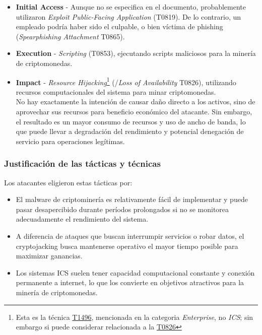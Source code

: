 \begin{itemize}
    \item \textbf{Initial Access} - Aunque no se especifica en el documento, probablemente utilizaron \textit{Exploit Public-Facing Application} (T0819). De lo contrario, un empleado podría haber sido el culpable, o bien víctima de phishing (\textit{Spearphishing Attachment} T0865).

        \item \textbf{Execution} - \textit{Scripting} (T0853), ejecutando scripts maliciosos para la minería de criptomonedas.
        
        \item \textbf{Impact} - \textit{Resource Hijacking}\footnote{Esta es la técnica \href{https://attack.mitre.org/techniques/T1496/}{T1496}, mencionada en la categoria \textit{Enterprise}, no \textit{ICS}; sin embargo si puede considerar relacionada a la \href{https://attack.mitre.org/techniques/T0826/}{T0826}} (/\textit{Loss of Availability} T0826), utilizando recursos computacionales del sistema para minar criptomonedas.\\
        No hay exactamente la intención de causar daño directo a los activos, sino de aprovechar sus recursos para beneficio económico del atacante.
        Sin embargo, el resultado es un mayor consumo de recursos y uso de ancho de banda, lo que puede llevar a degradación del rendimiento y potencial denegación de servicio para operaciones legítimas.
\end{itemize}

\subsubsection{Justificación de las tácticas y técnicas}
Los atacantes eligieron estas tácticas por:

\begin{itemize}
    
    \item El malware de criptominería es relativamente fácil de implementar y puede pasar desapercibido durante períodos prolongados si no se monitorea adecuadamente el rendimiento del sistema.
    
    \item A diferencia de ataques que buscan interrumpir servicios o robar datos, el cryptojacking busca mantenerse operativo el mayor tiempo posible para maximizar ganancias.
    
    \item Los sistemas ICS suelen tener capacidad computacional constante y conexión permanente a internet, lo que los convierte en objetivos atractivos para la minería de criptomonedas.

\end{itemize}

